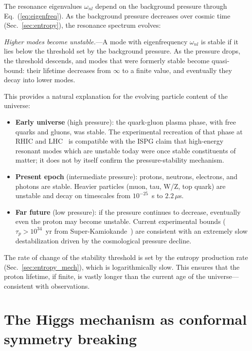 \documentclass[aps,prd,onecolumn,superscriptaddress,nofootinbib,showpacs,12pt,notitlepage]{revtex4-2}
\begin{document}
The resonance eigenvalues $\omega_{nl}$ depend on the
background pressure through Eq.~(\ref{eq:eigenfreq}).
As the background pressure decreases over cosmic time
(Sec.~\ref{sec:entropy}), the resonance spectrum evolves:

\textit{Higher modes become unstable.}---A mode with
eigenfrequency $\omega_{nl}$ is stable if it lies below
the threshold set by the background pressure.  As the
pressure drops, the threshold descends, and modes that were
formerly stable become quasi-bound: their lifetime decreases
from $\infty$ to a finite value, and eventually they decay
into lower modes.

This provides a natural explanation for the evolving
particle content of the universe:
\begin{itemize}
  \item \textbf{Early universe} (high pressure): the
    quark-gluon plasma phase, with free quarks and gluons,
    was stable.  The experimental recreation of that phase
    at RHIC and LHC~\cite{ALICE2010} is compatible with the
    ISPG claim that high-energy resonant modes which are
    unstable today were once stable constituents of
    matter; it does not by itself confirm the
    pressure-stability mechanism.
  \item \textbf{Present epoch} (intermediate pressure):
    protons, neutrons, electrons, and photons are stable.
    Heavier particles (muon, tau, W/Z, top quark) are
    unstable and decay on timescales from $10^{-25}$~s
    to $2.2\,\mu$s.
  \item \textbf{Far future} (low pressure): if the
    pressure continues to decrease, eventually even the
    proton may become unstable.  Current experimental
    bounds ($\tau_p > 10^{34}$~yr from
    Super-Kamiokande~\cite{SuperK2020}) are consistent
    with an extremely slow destabilization driven by
    the cosmological pressure decline.
\end{itemize}

The rate of change of the stability threshold is set by
the entropy production rate (Sec.~\ref{sec:entropy_mech}),
which is logarithmically slow.  This ensures that the
proton lifetime, if finite, is vastly longer than the
current age of the universe---consistent with
observations.

\section{The Higgs mechanism as conformal symmetry breaking}
\label{sec:higgs}
\end{document}
